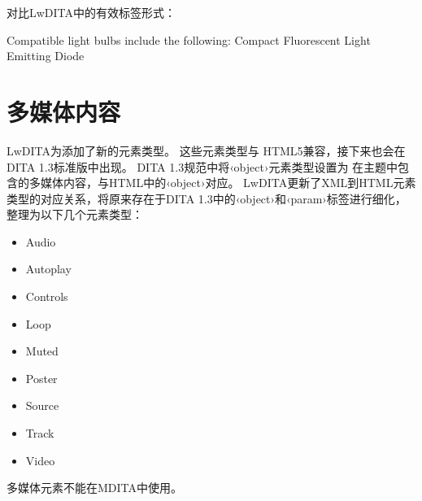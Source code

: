 \documentclass[letterpaper,10pt,english]{sphinxmanual}
\begin{document}
对比LwDITA中的有效标签形式：

\begin{sphinxVerbatim}[commandchars=\\\{\}]
Compatible light bulbs include the following:
Compact Fluorescent
Light Emitting Diode
\end{sphinxVerbatim}


\section{多媒体内容}
\label{\detokenize{chap3:id4}}
LwDITA为添加了新的元素类型。 这些元素类型与
HTML5兼容，接下来也会在DITA 1.3标准版中出现。
DITA 1.3规范中将‹object›元素类型设置为
在主题中包含的多媒体内容，与HTML中的‹object›对应。 LwDITA更新了XML到HTML元素类型的对应关系，将原来存在于DITA 1.3中的‹object›和‹param›标签进行细化，整理为以下几个元素类型：
\begin{itemize}
\item {} 
Audio

\item {} 
Autoplay

\item {} 
Controls

\item {} 
Loop

\item {} 
Muted

\item {} 
Poster

\item {} 
Source

\item {} 
Track

\item {} 
Video

\end{itemize}

 多媒体元素不能在MDITA中使用。
\end{document}
